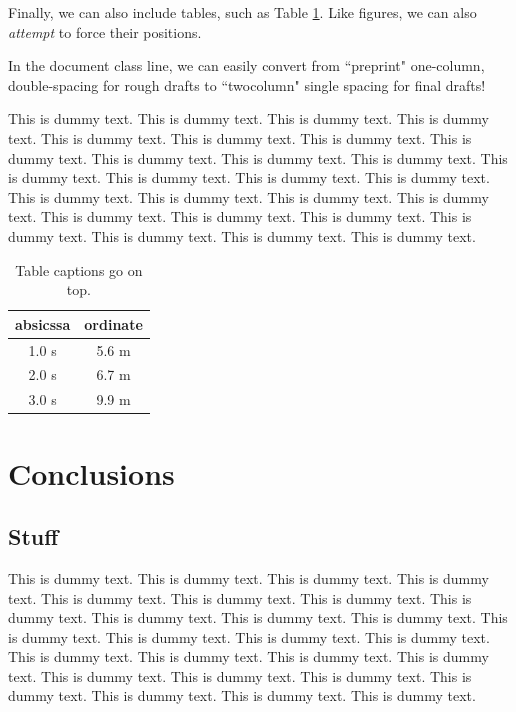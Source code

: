 \documentclass{book}
\begin{document}
Finally, we can also include tables, such as Table \ref{demoTable}. Like figures, we can also \emph{attempt} to force their positions. 

In the document class line, we can easily convert from ``preprint" one-column, double-spacing for rough drafts to ``twocolumn" single spacing for final drafts! 

This is dummy text. This is dummy text. This is dummy text. This is dummy text. This is dummy text. This is dummy text. This is dummy text. This is dummy text. This is dummy text. This is dummy text. This is dummy text. This is dummy text. This is dummy text. This is dummy text. This is dummy text. This is dummy text. This is dummy text. This is dummy text. This is dummy text. This is dummy text. This is dummy text. This is dummy text. This is dummy text. This is dummy text. This is dummy text. This is dummy text. 

\begin{table}[h] %
	\caption{Table captions go on top.}
	\label{demoTable}
	\begin{center}
		\begin{tabular}{cc} %
			absicssa & ordinate\\
			\hline
			1.0 s & 5.6 m\\
			2.0 s & 6.7 m\\
			3.0 s & 9.9 m
		\end{tabular}
	\end{center}
\end{table}

\chapter{Conclusions}\label{Conclusions}

\section{Stuff}
This is dummy text. This is dummy text. This is dummy text. This is dummy text. This is dummy text. This is dummy text. This is dummy text. This is dummy text. This is dummy text. This is dummy text. This is dummy text. This is dummy text. This is dummy text. This is dummy text. This is dummy text. This is dummy text. This is dummy text. This is dummy text. This is dummy text. This is dummy text. This is dummy text. This is dummy text. This is dummy text. This is dummy text. This is dummy text. This is dummy text. 
\end{document}
